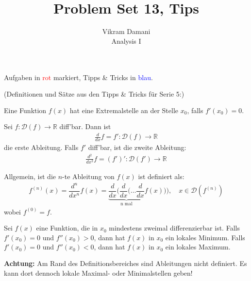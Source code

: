 \documentclass[12pt]{article}
\newcommand{\R}{\mathbb{R}} %
\newenvironment{definition}[2][Definition]{\begin{trivlist}
        \item[\hskip \labelsep {\bfseries #1}\hskip \labelsep {\bfseries #2.}]}{\flushright{$\square$}\end{trivlist}}
\newenvironment{problem}[2][\textcolor{blue}{Tipps \& Tricks zu}]{\begin{trivlist}
        \item[\hskip \labelsep {\bfseries #1}\hskip \labelsep {\bfseries \textcolor{blue}{#2}.}]}{\end{trivlist}}
\begin{document}
\title{Problem Set 13, Tips}
\author{Vikram Damani\\
        Analysis I}

\maketitle
Aufgaben in \textcolor{red}{rot} markiert, Tipps \& Tricks in \textcolor{blue}{blau}.

\begin{problem}{1}

\end{problem}
 (Definitionen und Sätze aus den Tipps \& Tricks für Serie 5:)
\begin{definition}{[Extremalstellen]}
        Eine Funktion $f(x)$ hat eine Extremalstelle an der Stelle $x_0$, falls $f'(x_0)=0$.
\end{definition}

\begin{definition}{[Höhere Ableitungen]}
        Sei $f:\mathcal{D}(f)\to\R$ diff'bar. Dann ist
        \begin{align}
                \frac{d}{dx}f=f':\mathcal{D}(f)\to\R
        \end{align}
        die erste Ableitung. Falls $f'$ diff'bar, ist die zweite Ableitung:
        \begin{align}
                \frac{d^2}{dx^2}f=(f')':\mathcal{D}(f')\to\R
        \end{align}

        Allgemein, ist die $n$-te Ableitung von $f(x)$ ist definiert als:
        \begin{align*}
                f^{(n)}(x)=\dfrac{d^n}{dx^n}f(x)=\underbrace{\dfrac{d}{dx}(\dfrac{d}{dx}(\ldots\dfrac{d}{dx}}_{\text{n mal}}f(x))),\quad x\in\mathcal{D}(f^{(n)})
        \end{align*}
        wobei $f^{(0)}=f$.
\end{definition}
\begin{definition}{[Maxima und Minima mit höheren Ableitungen]}
        Sei $f(x)$ eine Funktion, die in $x_0$ mindestens zweimal differenzierbar ist. Falls $f'(x_0)=0$ und $f''(x_0)>0$, dann hat $f(x)$ in $x_0$ ein lokales Minimum. Falls $f'(x_0)=0$ und $f''(x_0)<0$, dann hat $f(x)$ in
        $x_0$ ein lokales Maximum.

        \textbf{Achtung:} Am Rand des Definitionsbereiches sind Ableitungen nicht definiert. Es kann dort dennoch lokale Maximal- oder Minimalstellen geben!
\end{definition}
\end{document}
